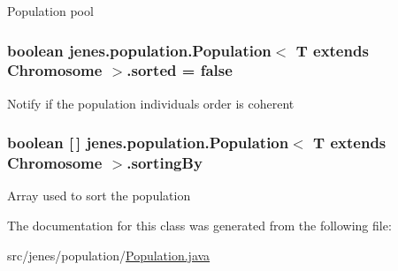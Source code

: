 Population pool \hypertarget{classjenes_1_1population_1_1_population_3_01_t_01extends_01_chromosome_01_4_a619b7d803a31dfd60ebacdf48e84c997}{
\subsubsection[{sorted}]{\setlength{\rightskip}{0pt plus 5cm}boolean jenes.\-population.\-Population$<$ T extends Chromosome $>$.sorted = false\hspace{0.3cm}{\ttfamily [private]}}}\label{classjenes_1_1population_1_1_population_3_01_t_01extends_01_chromosome_01_4_a619b7d803a31dfd60ebacdf48e84c997}
Notify if the population individuals order is coherent \hypertarget{classjenes_1_1population_1_1_population_3_01_t_01extends_01_chromosome_01_4_a7e2494bc6b09d2ebb28206fb0a7ca172}{
\subsubsection[{sorting\-By}]{\setlength{\rightskip}{0pt plus 5cm}boolean \mbox{[}$\,$\mbox{]} jenes.\-population.\-Population$<$ T extends Chromosome $>$.sorting\-By\hspace{0.3cm}{\ttfamily [private]}}}\label{classjenes_1_1population_1_1_population_3_01_t_01extends_01_chromosome_01_4_a7e2494bc6b09d2ebb28206fb0a7ca172}
Array used to sort the population 

The documentation for this class was generated from the following file\-:\begin{DoxyCompactItemize}
\item 
src/jenes/population/\hyperlink{_population_8java}{Population.\-java}\end{DoxyCompactItemize}
